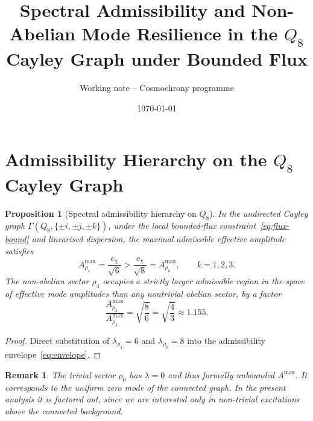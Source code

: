 \documentclass[11pt,a4paper]{article}
\title{Spectral Admissibility and Non-Abelian Mode Resilience
in the $Q_8$ Cayley Graph under Bounded Flux}
\author{Working note -- Cosmochrony programme}
\date{\today}
\newtheorem{proposition}{Proposition}
\newtheorem{remark}{Remark}
\begin{document}
  \maketitle

  \begin{abstract}
    
  \end{abstract}

  
  
  
  

  \section{Admissibility Hierarchy on the $Q_8$ Cayley Graph}

    \begin{proposition}[Spectral admissibility hierarchy on $Q_8$]
      \label{prop:main}
      In the undirected Cayley graph $\Gamma(Q_8, \{\pm i, \pm j, \pm k\})$,
      under the local bounded-flux constraint~\eqref{eq:flux-bound} and linearised
      dispersion, the maximal admissible effective amplitude satisfies
      \begin{equation}
        A^{\max}_{\rho_4} = \frac{c_\chi}{\sqrt{6}}
        >
        \frac{c_\chi}{\sqrt{8}}
        = A^{\max}_{\rho_k},
        \qquad
        k = 1,2,3.
      \end{equation}
      The non-abelian sector $\rho_4$ occupies a strictly larger admissible region in the
      space of effective mode amplitudes than any nontrivial abelian sector, by a factor
      \begin{equation}
        \frac{A^{\max}_{\rho_4}}{A^{\max}_{\rho_k}}
        =
        \sqrt{\frac{8}{6}}
        =
        \sqrt{\frac{4}{3}}
        \approx 1.155.
      \end{equation}
    \end{proposition}

    \begin{proof}
      Direct substitution of $\lambda_{\rho_4} = 6$ and $\lambda_{\rho_k} = 8$
      into the admissibility envelope~\eqref{eq:envelope}.
    \end{proof}

    \begin{remark}
      The trivial sector $\rho_0$ has $\lambda = 0$ and thus formally unbounded $A^{\max}$.
      It corresponds to the uniform zero mode of the connected graph.
      In the present analysis it is factored out, since we are interested only in
      non-trivial excitations above the connected background.
    \end{remark}
\end{document}
